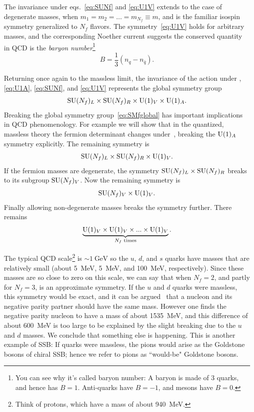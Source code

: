 The invariance under eqs.~\eqref{eq:SUNf} and \eqref{eq:U1V} extends to the case of degenerate
masses, when $m_1=m_2=...=m_{N_f}\equiv m$, and is the familiar isospin
symmetry generalized to $N_f$ flavors. The symmetry~\eqref{eq:U1V} holds for
arbitrary masses, and the corresponding Noether current suggests
the conserved quantity in QCD is the 
{\it baryon number}\footnote{You can see why it's called baryon number: 
A baryon is made of 3
quarks, and hence has $B=1$. Anti-quarks have $B=-1$, and
mesons have $B=0$.}
\begin{equation}
    B=\frac{1}{3}(n_q-n_{\bar{q}}).
\end{equation}


Returning once again to the massless limit, the invariance of the action under
, \eqref{eq:U1A}, \eqref{eq:SUNf}, and \eqref{eq:U1V}
represents the global symmetry group
\begin{equation}\label{eq:SMfglobal}
  \operatorname{SU}(N_f)_L\times\operatorname{SU}(N_f)_R\times\operatorname{U}(1)_V\times\operatorname{U}(1)_A.
\end{equation}
Breaking the global symmetry group~\eqref{eq:SMfglobal} has important
implications in QCD phenomenology. For example we will show that in the
quantized, massless theory the fermion determinant changes
under~, breaking the $\operatorname{U}(1)_A$ symmetry explicitly. The remaining
symmetry is
\begin{equation}\label{eq:SMglobalbUA}
  \operatorname{SU}(N_f)_L\times\operatorname{SU}(N_f)_R\times\operatorname{U}(1)_V.
\end{equation}
If the fermion masses are degenerate, the symmetry $\operatorname{SU}(N_f)_L\times\operatorname{SU}(N_f)_R$
breaks to its subgroup $\operatorname{SU}(N_f)_V$. Now the remaining symmetry is
\begin{equation}
  \operatorname{SU}(N_f)_V\times\operatorname{U}(1)_V.
\end{equation}
Finally allowing non-degenerate masses breaks the symmetry further.
There remains
\begin{equation}
  \underbrace{\operatorname{U}(1)_V\times\operatorname{U}(1)_V\times...\times\operatorname{U}(1)_V}_\text{$N_f$ times}.
\end{equation}

The typical QCD scale\footnote{Think of protons, which have a mass of about
940~MeV.} is $\sim1~\text{GeV}$ 
so the $u$, $d$, and $s$ quarks have masses that
are relatively small (about 5~MeV, 5~MeV, and 100~MeV, respectively).
Since these masses are so close to zero on this scale, we can say that
when $N_f=2$, and partly for $N_f=3$,  is
an approximate symmetry. If the $u$ and $d$ quarks were massless, this symmetry
would be exact, and it can be argued~\cite{gattringer_quantum_2010} that
a nucleon and its negative parity partner should have the same mass.
However one finds the negative parity nucleon to have
a mass of about 1535~MeV, and this difference of about 600~MeV is too large to
be explained by the slight breaking due to the $u$ and $d$ masses. We
conclude that something else is happening. This is another example
of SSB: If quarks were massless, the pions would arise as
the Goldstone bosons of chiral SSB; hence we refer to pions as
``would-be" Goldstone bosons.

